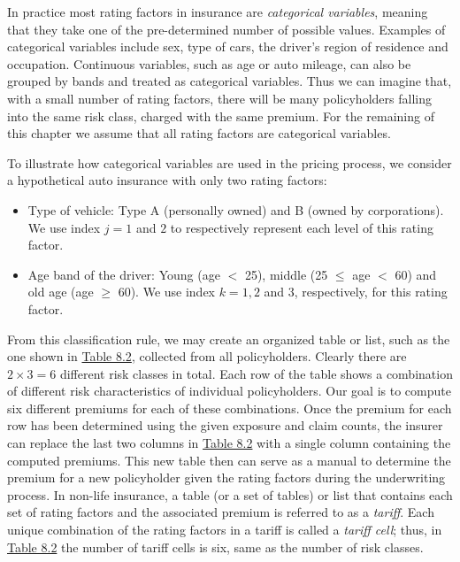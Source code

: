 \documentclass[]{book}
\providecommand{\tightlist}{%
  \setlength{\itemsep}{0pt}\setlength{\parskip}{0pt}}
\theoremstyle{definition}
\theoremstyle{definition}
\theoremstyle{definition}
\theoremstyle{remark}
\begin{document}
In practice most rating factors in insurance are \emph{categorical
variables}, meaning that they take one of the pre-determined number of
possible values. Examples of categorical variables include sex, type of
cars, the driver's region of residence and occupation. Continuous
variables, such as age or auto mileage, can also be grouped by bands and
treated as categorical variables. Thus we can imagine that, with a small
number of rating factors, there will be many policyholders falling into
the same risk class, charged with the same premium. For the remaining of
this chapter we assume that all rating factors are categorical
variables.

To illustrate how categorical variables are used in the pricing process,
we consider a hypothetical auto insurance with only two rating factors:

\begin{itemize}
\tightlist
\item
  Type of vehicle: Type A (personally owned) and B (owned by
  corporations). We use index \(j=1\) and \(2\) to respectively
  represent each level of this rating factor.\\
\item
  Age band of the driver: Young (age \(<\) 25), middle (25 \(\le\) age
  \(<\) 60) and old age (age \(\ge\) 60). We use index \(k=1, 2\) and
  \(3\), respectively, for this rating factor.
\end{itemize}

From this classification rule, we may create an organized table or list,
such as the one shown in \protect\hyperlink{tab:8.2}{Table 8.2},
collected from all policyholders. Clearly there are \(2 \times 3=6\)
different risk classes in total. Each row of the table shows a
combination of different risk characteristics of individual
policyholders. Our goal is to compute six different premiums for each of
these combinations. Once the premium for each row has been determined
using the given exposure and claim counts, the insurer can replace the
last two columns in \protect\hyperlink{tab:8.2}{Table 8.2} with a single
column containing the computed premiums. This new table then can serve
as a manual to determine the premium for a new policyholder given the
rating factors during the underwriting process. In non-life insurance, a
table (or a set of tables) or list that contains each set of rating
factors and the associated premium is referred to as a \emph{tariff}.
Each unique combination of the rating factors in a tariff is called a
\emph{tariff cell}; thus, in \protect\hyperlink{tab:8.2}{Table 8.2} the
number of tariff cells is six, same as the number of risk classes.
\end{document}
